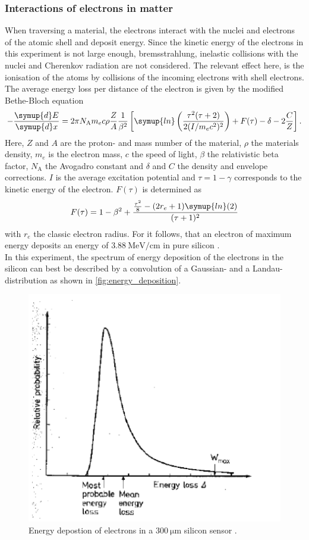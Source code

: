 \subsubsection{Interactions of electrons in matter}
\label{sec:therory_interactions}
When traversing a material, the electrons interact with the nuclei and electrons of the atomic shell and deposit energy. Since the kinetic energy of the electrons in this experiment
is not large enough, bremsstrahlung, inelastic collisions with the nuclei and Cherenkov radiation are not considered. The relevant effect here, is the ionisation of the atoms by 
collisions of the incoming electrons with shell electrons. The average energy loss per distance of the electron is given by the modified Bethe-Bloch equation \cite{Leo1987}
\begin{equation}
    -\frac{\symup{d}E}{\symup{d}x} = 2 \mathrm{\pi} N_\text{A} m_e c \rho \frac{Z}{A} \frac{1}{\beta^2}
    \left[ \symup{ln}\left(\frac{\tau^2(\tau +2)}{2(I/m_ec^2)^2}\right) + F(\tau) -\delta -2 \frac{C}{Z}\right].
    \label{eq:bethe_bloch}
\end{equation}
Here, $Z$ and $A$ are the proton- and mass number of the material, $\rho$ the materials density, $m_e$ is the electron mass, $c$ the speed of light, 
$\beta$ the relativistic beta factor, $N_\text{A}$ the Avogadro constant and $\delta$ and $C$ the density and envelope corrections. $I$ is the average excitation potential and 
$\tau = 1 - \gamma$ corresponds to the kinetic energy of the electron. $F(\tau)$ is determined as
\begin{equation*}
    F(\tau) = 1-\beta^2 + \frac{\frac{\tau^2}{8}- (2r_e + 1)\symup{ln}(2)}{(\tau+1)^2}
\end{equation*}
with $r_e$ the classic electron radius. For  it follows, that an electron of maximum energy deposits an energy of $\qty{3.88}{\mega\eV\per\cm}$ in pure 
silicon \cite{SiliconStrip}. \\
In this experiment, the spectrum of energy deposition of the electrons in the silicon can best be described by a convolution of a Gaussian- and a Landau- distribution as shown
in \autoref{fig:energy_deposition}.
\begin{figure}
    \centering 
    \includegraphics[width = .5\textwidth]{content/pics/energy_deposition.png}
    \caption{Energy depostion of electrons in a $\qty{300}{\micro\meter}$ silicon sensor \cite{SiliconStrip}.}
    \label{fig:energy_deposition}
\end{figure}

